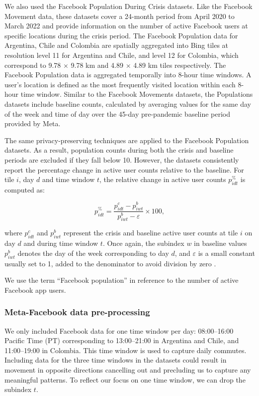 \documentclass[fleqn,10pt]{wlscirep}
\begin{document}
We also used the Facebook Population During Crisis datasets.
Like the Facebook Movement data, these datasets cover a 24-month period from April 2020 to March 2022 and provide information on the number of active Facebook users at specific locations during the crisis period. The Facebook Population data for Argentina, Chile and Colombia are spatially aggregated into Bing tiles at resolution level 11 for Argentina and Chile, and level 12 for Colombia, which correspond to 9.78 $\times$ 9.78 km and 4.89 $\times$ 4.89 km tiles respectively. The Facebook Population data is aggregated temporally into 8-hour time windows. A user's location is defined as the most frequently visited location within each 8-hour time window.
Similar to the Facebook Movements datasets, the Populations datasets include baseline counts, calculated by averaging values for the same day of the week and time of day over the 45-day pre-pandemic baseline period provided by Meta.

The same privacy-preserving techniques are applied to the Facebook Population datasets.
As a result, population counts during both the crisis and baseline periods are excluded if they fall below 10.
However, the datasets consistently report the percentage change in active user counts relative to the baseline.
For tile $i$, day $d$ and time window $t$, the relative change in active user counts $p^{\%}_{idt}$ is computed as:

\begin{equation}
   p^{\%}_{idt} = \dfrac{p^{c}_{idt} - p^b_{iwt}}{p^b_{iwt} - \varepsilon}\times 100, 
\end{equation}

where $p^c_{idt}$ and $p^b_{iwt}$ represent the crisis and baseline active user counts at tile $i$ on day $d$ and during time window $t$.
Once again, the subindex $w$ in baseline values $p^b_{iwt}$ denotes the day of the week corresponding to day $d$, and $\varepsilon$ is a small constant usually set to 1, added to the denominator to avoid division by zero \cite{Maas19}.

We use the term ``Facebook population'' in reference to the number of active Facebook app users.

\subsubsection*{Meta-Facebook data pre-processing}

We only included Facebook data for one time window per day: 08:00–16:00 Pacific Time (PT) corresponding to 13:00–21:00 in Argentina and Chile, and 11:00–19:00 in Colombia.
This time window is used to capture daily commutes.
Including data for the three time windows in the datasets could result in movement in opposite directions cancelling out and precluding us to capture any meaningful patterns.
To reflect our focus on one time window, we can drop the subindex $t$.
\end{document}
